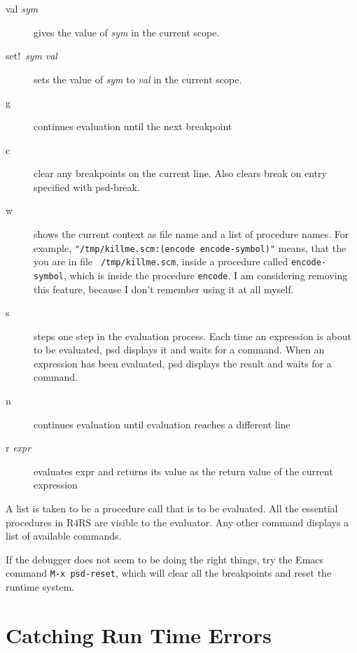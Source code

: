 \begin{description}
\item[val {\it sym}] 
  gives the value of {\it sym} in the current scope.

\item[set!\ {\it sym} {\it val}] 
  sets the value of {\it sym} to {\it val} in the current scope.

\item[g]
  continues evaluation until the next breakpoint

\item[c]
  clear any breakpoints on the current line. Also clears break on
  entry specified with psd-break.

\item[w]
  shows the current context as file name and a list of procedure names. For
  example,  {\tt "/tmp/killme.scm:(encode
  encode-symbol)"} means, that the you are in file {\tt
  /tmp/killme.scm}, inside a procedure called {\tt encode-symbol}, which
  is inside the procedure {\tt encode}. I am considering removing this
  feature, because I don't remember using it at all myself.

\item[s] 
  steps one step in the evaluation process. Each time an expression is
  about to be evaluated, psd displays it and
  waits for a command. When an expression has been evaluated, psd
  displays the result and waits for a command.

\item[n] 
  continues evaluation until evaluation reaches a different line

\item[r {\it expr}] 
  evaluates expr and returns its value as the return value of the
  current expression

\end{description}

A list is taken to be a procedure call that is to be evaluated. All
the essential procedures in R4RS are visible to the evaluator. Any
other command displays a list of available commands.

If the debugger does not seem to be doing the right things, try the
Emacs command {\tt M-x psd-reset}, which will clear all the breakpoints
and reset the runtime system.

\section{Catching Run Time Errors}
\label{sec:runtimeerrors}

